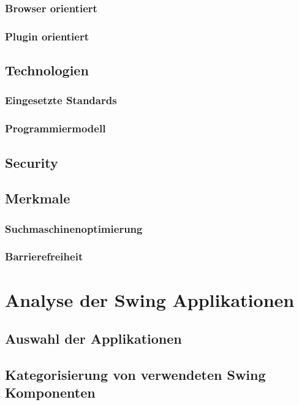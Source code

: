 \documentclass[
11pt, %
a4paper, %
BCOR25mm, %
DIV14, %
footsepline = false, %
headsepline, %
twoside, %
openright,
abstracton, %
listof=totocnumbered, %
bibliography=totocnumbered %
]{scrreprt}
\begin{document}
  \subsection{Browser orientiert}
  
  \subsection{Plugin orientiert}
  
  \section{Technologien}
  
  \subsection{Eingesetzte Standards}
  
  \subsection{Programmiermodell}
  
  \section{Security}
  
  \section{Merkmale}
    
  \subsection{Suchmaschinenoptimierung}
  
  \subsection{Barrierefreiheit}
  
  \chapter{Analyse der Swing Applikationen}
  
  \section{Auswahl der Applikationen}
  
  \section{Kategorisierung von verwendeten Swing Komponenten}
  
\end{document}
